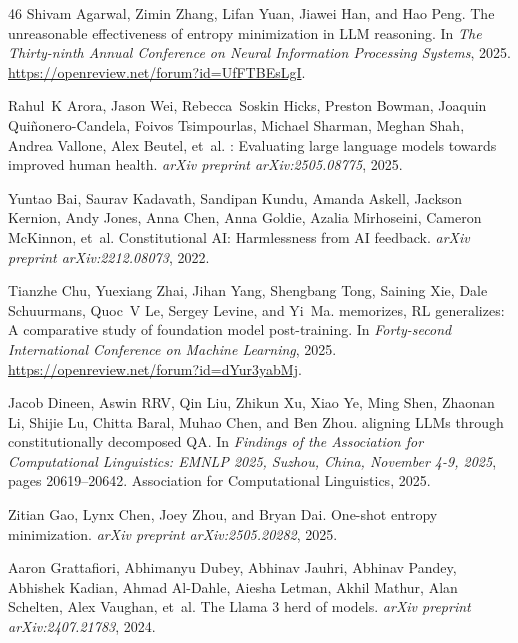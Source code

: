 \begin{thebibliography}{46}
Shivam Agarwal, Zimin Zhang, Lifan Yuan, Jiawei Han, and Hao Peng.
\newblock The unreasonable effectiveness of entropy minimization in {LLM} reasoning.
\newblock In \emph{The Thirty-ninth Annual Conference on Neural Information Processing Systems}, 2025.
\newblock \url{https://openreview.net/forum?id=UfFTBEsLgI}.

Rahul~K Arora, Jason Wei, Rebecca~Soskin Hicks, Preston Bowman, Joaquin Qui{\~n}onero-Candela, Foivos Tsimpourlas, Michael Sharman, Meghan Shah, Andrea Vallone, Alex Beutel, et~al.
: Evaluating large language models towards improved human health.
\newblock \emph{arXiv preprint arXiv:2505.08775}, 2025.

Yuntao Bai, Saurav Kadavath, Sandipan Kundu, Amanda Askell, Jackson Kernion, Andy Jones, Anna Chen, Anna Goldie, Azalia Mirhoseini, Cameron McKinnon, et~al.
\newblock Constitutional {AI}: Harmlessness from {AI} feedback.
\newblock \emph{arXiv preprint arXiv:2212.08073}, 2022.

Tianzhe Chu, Yuexiang Zhai, Jihan Yang, Shengbang Tong, Saining Xie, Dale Schuurmans, Quoc~V Le, Sergey Levine, and Yi~Ma.
 memorizes, {RL} generalizes: A comparative study of foundation model post-training.
\newblock In \emph{Forty-second International Conference on Machine Learning}, 2025.
\newblock \url{https://openreview.net/forum?id=dYur3yabMj}.

Jacob Dineen, Aswin RRV, Qin Liu, Zhikun Xu, Xiao Ye, Ming Shen, Zhaonan Li, Shijie Lu, Chitta Baral, Muhao Chen, and Ben Zhou.
 aligning {LLMs} through constitutionally decomposed {QA}.
\newblock In \emph{Findings of the Association for Computational Linguistics: {EMNLP} 2025, Suzhou, China, November 4-9, 2025}, pages 20619--20642. Association for Computational Linguistics, 2025.

Zitian Gao, Lynx Chen, Joey Zhou, and Bryan Dai.
\newblock One-shot entropy minimization.
\newblock \emph{arXiv preprint arXiv:2505.20282}, 2025.

Aaron Grattafiori, Abhimanyu Dubey, Abhinav Jauhri, Abhinav Pandey, Abhishek Kadian, Ahmad Al-Dahle, Aiesha Letman, Akhil Mathur, Alan Schelten, Alex Vaughan, et~al.
\newblock The {Llama} 3 herd of models.
\newblock \emph{arXiv preprint arXiv:2407.21783}, 2024.


\end{thebibliography}
